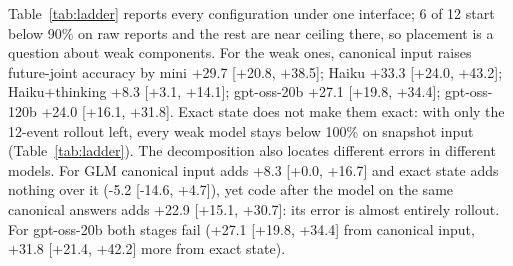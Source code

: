 Table~\ref{tab:ladder} reports every configuration under one interface; 6 of 12 start below 90\% on raw reports and the rest are near ceiling there, so placement is a question about weak components. For the weak ones, canonical input raises future-joint accuracy by mini +29.7 [+20.8, +38.5]; Haiku +33.3 [+24.0, +43.2]; Haiku+thinking +8.3 [+3.1, +14.1]; gpt-oss-20b +27.1 [+19.8, +34.4]; gpt-oss-120b +24.0 [+16.1, +31.8]. Exact state does not make them exact: with only the 12-event rollout left, every weak model stays below 100\% on snapshot input (Table~\ref{tab:ladder}). The decomposition also locates different errors in different models. For GLM canonical input adds +8.3 [+0.0, +16.7] and exact state adds nothing over it (-5.2 [-14.6, +4.7]), yet code after the model on the same canonical answers adds +22.9 [+15.1, +30.7]: its error is almost entirely rollout. For gpt-oss-20b both stages fail (+27.1 [+19.8, +34.4] from canonical input, +31.8 [+21.4, +42.2] more from exact state). 
